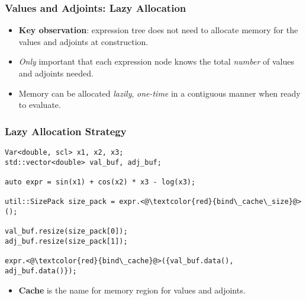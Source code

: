 \begin{frame}
\frametitle{Values and Adjoints: Lazy Allocation}
\begin{itemize}

\item \textbf{Key observation}: expression tree does not need to 
    allocate memory for the values and adjoints at construction.

\item \emph{Only} important that each expression node knows 
    the total \emph{number} of values and adjoints needed.

\item Memory can be allocated \emph{lazily},
    \emph{one-time} in a contiguous manner when ready to evaluate.

\end{itemize}
\end{frame}

\begin{frame}[fragile]
\frametitle{Lazy Allocation Strategy}
\begin{lstlisting}[style=customcpp]
Var<double, scl> x1, x2, x3;
std::vector<double> val_buf, adj_buf;

auto expr = sin(x1) + cos(x2) * x3 - log(x3);

util::SizePack size_pack = expr.<@\textcolor{red}{bind\_cache\_size}@>();

val_buf.resize(size_pack[0]);
adj_buf.resize(size_pack[1]);

expr.<@\textcolor{red}{bind\_cache}@>({val_buf.data(), adj_buf.data()});
\end{lstlisting}

\begin{itemize}

\item \textbf{Cache} is the name for memory region for values and adjoints.

\end{itemize}
\end{frame}

